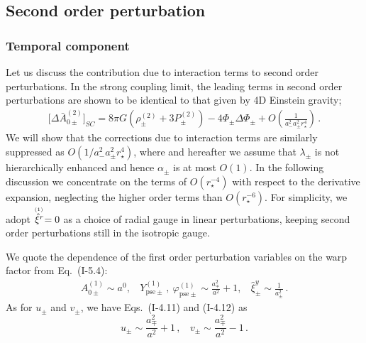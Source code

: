 \documentclass[a4paper,showpacs,preprintnumbers,amsmath,amssymb]{revtex4}
\begin{document}
 


\subsection{Second order perturbation}

\subsubsection{Temporal component}

Let us discuss the contribution due to interaction terms to second order perturbations. 
In the strong coupling limit, the leading terms in second order perturbations are shown to be identical to that given by 4D Einstein gravity;
\begin{eqnarray}
  \bigl[ \Delta \bar A^{(2)} _{0\pm} \bigr]_{SC}
  =   8 \pi G(\rho_\pm^{(2)} +3P_\pm^{(2)}) 
    - 4 \Phi_\pm \Delta \Phi_\pm  
    + O\left( \frac{1}{a_-^2 a_{\pm}^2 r_\star^4} \right)
    \,. 
\end{eqnarray}
We will show that the corrections due to interaction terms are similarly suppressed as $O(1/a_{-}^2 a_{\pm}^2 r_\star^{4})$, where and hereafter we assume that $\lambda_\pm$ is not hierarchically enhanced and hence $\alpha_\pm$ is at most $O(1)$. 
In the following discussion we concentrate on the terms of $O(r_\star^{-4})$ with respect to the derivative expansion, neglecting the higher order terms than $O(r_\star^{-6})$. 
For simplicity, we adopt $\stackrel{\scriptscriptstyle {(1)\,}}{\hat \xi^r}=0$ as a choice of radial gauge in linear perturbations, keeping second order perturbations still in the isotropic gauge. 
 

We quote the dependence of the first order perturbation variables on the warp factor from Eq.~(I-5.4): 
\begin{eqnarray}
A_{0\pm}^{(1)} \sim a^0, ~~~~
Y_{ \mathrm{pse} \pm}^{(1)} \,, ~ 
\varphi_{ \mathrm{pse}  \pm}^{(1)}  \sim \frac{a_{\mp}^2}{a^2}+1, ~~~~
\hat\xi^y_{\pm} \sim \frac{1}{a_{\pm}^2} \,. 
\label{eq:count a r 1}
\end{eqnarray}  
As for $u_\pm$ and $v_\pm$, we have Eqs.~(I-4.11) and (I-4.12) as 
\begin{equation}
  u_{\pm}  \sim \frac{a_{\mp}^2}{a^2}+1\,, ~~~~
  v_{\pm}  \sim \frac{a_{\mp}^2}{a^2}-1\,.
\label{eq:count uv}
\end{equation}
\end{document}
